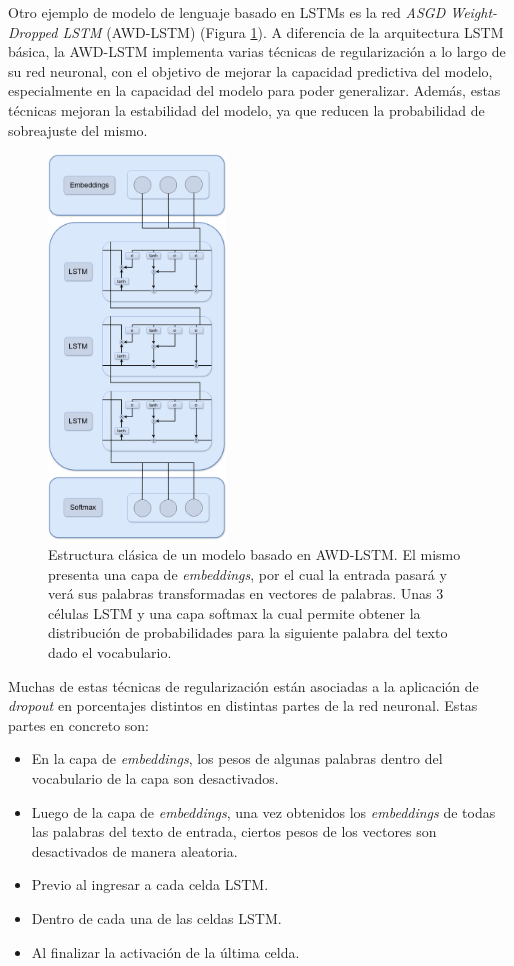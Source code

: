 Otro ejemplo de modelo de lenguaje basado en LSTMs es la red \textit{ASGD Weight-Dropped LSTM} (AWD-LSTM) (Figura \ref{fig:awd-lstm}). A diferencia de la arquitectura LSTM básica, la AWD-LSTM implementa varias técnicas de regularización a lo largo de su red neuronal, con el objetivo de mejorar la capacidad predictiva del modelo, especialmente en la capacidad del modelo para poder generalizar. Además, estas técnicas mejoran la estabilidad del modelo, ya que reducen la probabilidad de sobreajuste del mismo.

\begin{figure}[htb]
    \centering
    \includegraphics[width=0.42\textwidth]{imagenes/AWD-LSTM.drawio.png}
    \caption{Estructura clásica de un modelo basado en AWD-LSTM. El mismo presenta una capa de \textit{embeddings}, por el cual la entrada pasará y verá sus palabras transformadas en vectores de palabras. Unas 3 células LSTM y una capa softmax la cual permite obtener la distribución de probabilidades para la siguiente palabra del texto dado el vocabulario.}
    \label{fig:awd-lstm}
\end{figure}

Muchas de estas técnicas de regularización están asociadas a la aplicación de \textit{dropout} en porcentajes distintos en distintas partes de la red neuronal. Estas partes en concreto son:

\begin{itemize}
    \item En la capa de \textit{embeddings}, los pesos de algunas palabras dentro del vocabulario de la capa son desactivados.
    \item Luego de la capa de \textit{embeddings}, una vez obtenidos los \textit{embeddings} de todas las palabras del texto de entrada, ciertos pesos de los vectores son desactivados de manera aleatoria.
    \item Previo al ingresar a cada celda LSTM.
    \item Dentro de cada una de las celdas LSTM.
    \item Al finalizar la activación de la última celda.
\end{itemize}

